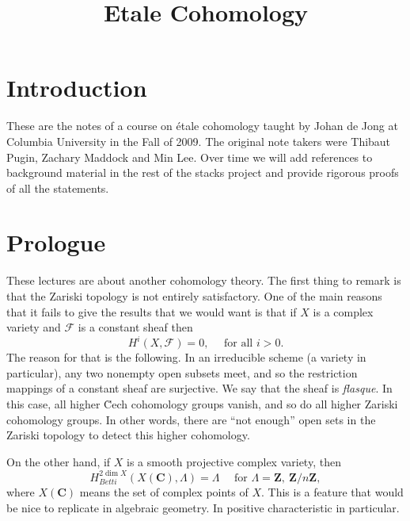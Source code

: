 

%


\title{Etale Cohomology}


\maketitle

\label{section-phantom}

\tableofcontents


\section{Introduction}
\label{section-introduction}

\noindent
These are the notes of a course on \'etale cohomology taught by Johan de Jong
at Columbia University in the Fall of 2009. The original note takers were
Thibaut Pugin, Zachary Maddock and Min Lee. Over time we will add references
to background material in the rest of the stacks project and provide rigorous
proofs of all the statements.

\section{Prologue}
\label{section-prologue}

\noindent
These lectures are about another cohomology theory. The first thing to remark
is that the Zariski topology is not entirely satisfactory. One of the main
reasons that it fails to give the results that we would want is that if $X$ is
a complex variety and $\mathcal{F}$ is a constant sheaf then
$$
H^i(X, \mathcal{F}) = 0, \quad \text{ for all } i > 0.
$$
The reason for that is the following. In an irreducible scheme (a variety in
particular), any two nonempty open subsets meet, and so the restriction
mappings of a constant sheaf are surjective. We say that the sheaf is
{\it flasque}. In this case, all higher \u Cech cohomology groups vanish, and
so do all higher Zariski cohomology groups. In other words, there are ``not
enough'' open sets in the Zariski topology to detect this higher cohomology.

\medskip\noindent
On the other hand, if $X$ is a smooth projective complex variety, then
$$
H_{Betti}^{2 \dim X}(X (\mathbf{C}), \Lambda) = \Lambda \quad \text{ for }
\Lambda = \mathbf{Z}, \ \mathbf{Z}/n\mathbf{Z},
$$
where $X(\mathbf{C})$ means the set of complex points of $X$. This is a feature
that would be nice to replicate in algebraic geometry. In positive
characteristic in particular.




